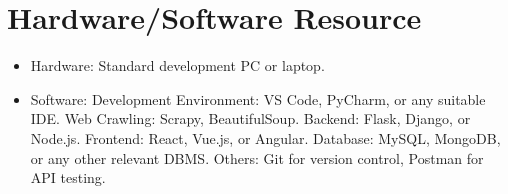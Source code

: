 \documentclass[a4paper]{article}
\begin{document}
\section{Hardware/Software Resource}

\begin{itemize}
    \item Hardware: Standard development PC or laptop.
    \item Software:
    \subitem Development Environment: VS Code, PyCharm, or any suitable IDE.
    \subitem Web Crawling: Scrapy, BeautifulSoup.
    \subitem Backend: Flask, Django, or Node.js.
    \subitem Frontend: React, Vue.js, or Angular.
    \subitem Database: MySQL, MongoDB, or any other relevant DBMS.
    \subitem Others: Git for version control, Postman for API testing.
\end{itemize}
\end{document}
